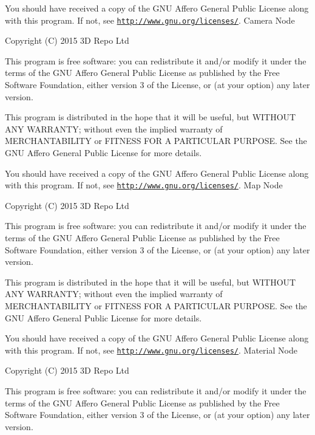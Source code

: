 You should have received a copy of the G\+N\+U Affero General Public License along with this program. If not, see \href{http://www.gnu.org/licenses/}{\tt http\+://www.\+gnu.\+org/licenses/}. Camera Node

Copyright (C) 2015 3\+D Repo Ltd

This program is free software\+: you can redistribute it and/or modify it under the terms of the G\+N\+U Affero General Public License as published by the Free Software Foundation, either version 3 of the License, or (at your option) any later version.

This program is distributed in the hope that it will be useful, but W\+I\+T\+H\+O\+U\+T A\+N\+Y W\+A\+R\+R\+A\+N\+T\+Y; without even the implied warranty of M\+E\+R\+C\+H\+A\+N\+T\+A\+B\+I\+L\+I\+T\+Y or F\+I\+T\+N\+E\+S\+S F\+O\+R A P\+A\+R\+T\+I\+C\+U\+L\+A\+R P\+U\+R\+P\+O\+S\+E. See the G\+N\+U Affero General Public License for more details.

You should have received a copy of the G\+N\+U Affero General Public License along with this program. If not, see \href{http://www.gnu.org/licenses/}{\tt http\+://www.\+gnu.\+org/licenses/}. Map Node

Copyright (C) 2015 3\+D Repo Ltd

This program is free software\+: you can redistribute it and/or modify it under the terms of the G\+N\+U Affero General Public License as published by the Free Software Foundation, either version 3 of the License, or (at your option) any later version.

This program is distributed in the hope that it will be useful, but W\+I\+T\+H\+O\+U\+T A\+N\+Y W\+A\+R\+R\+A\+N\+T\+Y; without even the implied warranty of M\+E\+R\+C\+H\+A\+N\+T\+A\+B\+I\+L\+I\+T\+Y or F\+I\+T\+N\+E\+S\+S F\+O\+R A P\+A\+R\+T\+I\+C\+U\+L\+A\+R P\+U\+R\+P\+O\+S\+E. See the G\+N\+U Affero General Public License for more details.

You should have received a copy of the G\+N\+U Affero General Public License along with this program. If not, see \href{http://www.gnu.org/licenses/}{\tt http\+://www.\+gnu.\+org/licenses/}. Material Node

Copyright (C) 2015 3\+D Repo Ltd

This program is free software\+: you can redistribute it and/or modify it under the terms of the G\+N\+U Affero General Public License as published by the Free Software Foundation, either version 3 of the License, or (at your option) any later version.

